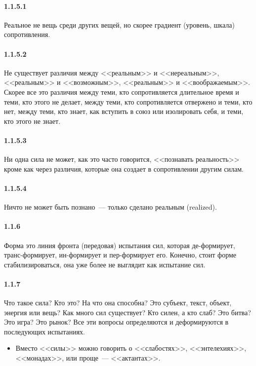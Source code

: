 \paragraph{1.1.5.1}\hypertarget{par:1.1.5.1}{} Реальное не вещь среди других вещей, но скорее градиент (уровень, шкала) сопротивления.

\paragraph{1.1.5.2}\hypertarget{par:1.1.5.2}{} Не существует различия между <<реальным>> и <<нереальным>>, <<реальным>> и <<возможным>>, <<реальным>> и <<воображаемым>>. Скорее все это различия между теми, кто сопротивляется длительное время и теми, кто этого не делает, между теми, кто сопротивляется отвержено и теми, кто нет, между теми, кто знает, как вступить в союз или изолировать себя, и теми, кто этого не знает.

\paragraph{1.1.5.3}\hypertarget{par:1.1.5.3}{} Ни одна сила не может, как это часто говорится, <<познавать реальность>> кроме как через различия, которые она создает в сопротивлении другим силам.

\paragraph{1.1.5.4}\hypertarget{par:1.1.5.4}{} Ничто не может быть познано~--- только сделано реальным (realized).

\paragraph{1.1.6}\hypertarget{par:1.1.6}{} Форма это линия фронта (передовая) испытания сил, которая де-формирует, транс-формирует, ин-формирует и пер-формирует его. Конечно, стоит форме стабилизироваться, она уже более не выглядит как испытание сил.

\paragraph{1.1.7}\hypertarget{par:1.1.7}{} Что такое сила? Кто это? На что она способна? Это субъект, текст, объект, энергия или вещь? Как много сил существует? Кто силен, а кто слаб? Это битва? Это игра?
Это рынок? Все эти вопросы определяются и деформируются в последующих
испытаниях.
	\begin{itemize}
	\item Вместо <<силы>> можно говорить о <<слабостях>>, <<энтелехиях>>, <<монадах>>, или проще~--- <<актантах>>.
	\end{itemize}

